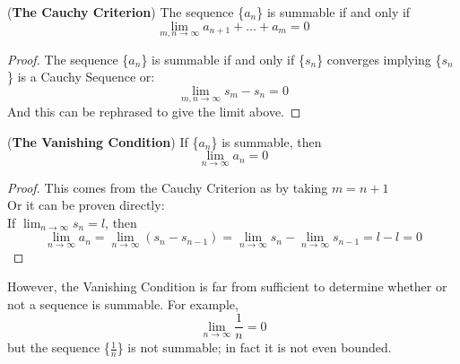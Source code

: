 \begin{lemma}
    (\textbf{The Cauchy Criterion}) The sequence \{$a_n$\} is summable if and only if 
    $$\lim_{m,n\to \infty} a_{n+1} + \dots + a_m = 0$$ 
\end{lemma}
\begin{proof}
    The sequence \{$a_n$\} is summable if and only if \{$s_n$\} converges implying \{$s_n$\} is a Cauchy Sequence or:
    $$\lim_{m,n \to \infty} s_m - s_n = 0$$
    And this can be rephrased to give the limit above.
\end{proof}

\begin{lemma}
    (\textbf{The Vanishing Condition}) If \{$a_n$\} is summable, then $$\lim_{n\to\infty}a_n = 0$$
\end{lemma}
\newpage
\begin{proof}
    This comes from the Cauchy Criterion as by taking $m= n+1$ \\
    Or it can be proven directly: \\ 
    If $\lim_{n \to \infty} s_n = l$, then 
        $$\lim_{n\to \infty} a_n = \lim_{n \to \infty} (s_n- s_{n-1}) = \lim_{n\to \infty} s_n - \lim _{n \to \infty} s_{n-1} = l-l =0$$
\end{proof} \bigskip

However, the Vanishing Condition is far from sufficient to determine whether or not a sequence is summable. For example, 
$$\lim_{n \to \infty}\frac{1}{n}=0 $$
but the sequence \{$\frac{1}{n}$\}  is not summable; in fact it is not even bounded.

